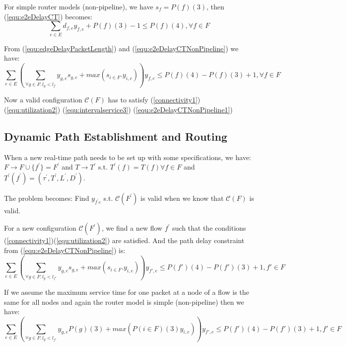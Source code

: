 \documentclass[a4]{article}
\begin{document}
For simple router models (non-pipeline), we have $s_f = P(f)(3)$, then
(\ref{equ:e2eDelayCT}) becomes:
\begin{equation}\label{equ:e2eDelayCTNonPipeline}
\sum_{e \in E}d_{f,e}y_{f,e} + P(f)(3) - 1 \leq P(f)(4), \forall f \in F
\end{equation}

From (\ref{equ:edgeDelayPacketLength}) and (\ref{equ:e2eDelayCTNonPipeline}) we have:
\begin{equation}\label{equ:e2eDelayCTNonPipeline1}
\sum_{e \in E} (\sum_{\forall g \in F:l_g <
l_{f}}y_{g,e}s_{g,e}+max(s_{i \in F}.y_{i,e}))y_{f,e} \leq P(f)(4)-P(f)(3) + 1,
\forall f \in F
\end{equation}

Now a valid configuration $\mathcal{C}(F)$ has to satisfy (\ref{connectivity1}) 
(\ref{equ:utilization2})
(\ref{equ:intervalservice3}) (\ref{equ:e2eDelayCTNonPipeline1})

\subsection{Dynamic Path Establishment and Routing}
When a new real-time path needs to be set up with some specifications, we have:
$F \rightarrow F \cup \{f^{'} \}=F^{'}$
and $T \rightarrow T^{'}$ s.t. $T^{'} (f)=T(f)\forall f \in F$ and $T^{'} (f^{'} )=(\tau ^{'}, T^{'}, L^{'}, D^{'})$.

The problem becomes: Find $y_{f^{'}e}$ s.t. $\mathcal{C}(F^{'})$ is valid
when we know that $\mathcal{C}(F)$ is valid.

For a new configuration $\mathcal{C}(F^{'})$, we find a new flow $f^{'}$ such that
the conditions (\ref{connectivity1})(\ref{equ:utilization2}) are satisfied. And
the path delay constraint from (\ref{equ:e2eDelayCTNonPipeline}) is:
\begin{equation}\label{equ:e2eDelayNewPath}
\sum_{e \in E} (\sum_{\forall g \in F:l_g <
l_{f'}}y_{g,e}s_{g,e}+max(s_{i \in F}.y_{i,e}))y_{f',e} \leq P(f')(4)-P(f')(3) +
1, f' \in F
\end{equation}

If we assume the maximum service time for one packet at a node of a flow is the same
for all nodes and again the router model is simple (non-pipeline) then we have:
\begin{equation}\label{equ:e2eDelayNewPath2}
\sum_{e \in E} (\sum_{\forall g \in F:l_g <
l_{f'}}y_{g,e}P(g)(3)+max(P(i \in F)(3)y_{i,e}))y_{f',e} \leq P(f')(4)-P(f')(3)
+ 1, f' \in F
\end{equation}
\end{document}
